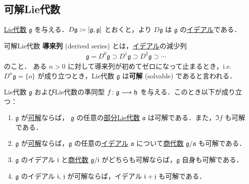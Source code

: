 \documentclass[rep_main]{subfiles}
\begin{document}
\subsection{可解Lie代数}

\hyperref[ax:LieAlg]{Lie代数} $\mathfrak{g}$ を与える．$D \mathfrak{g} \coloneqq \comm{\mathfrak{g}}{\mathfrak{g}}$ とおくと，より $D \mathfrak{g}$ は $\mathfrak{g}$ の\hyperref[def:ideal-LieAlg]{イデアル}である．

\begin{mydef}[label=def:solvable-LieAlg]{可解Lie代数}
    \textbf{導来列} (derived series) とは，\hyperref[def:ideal-LieAlg]{イデアル}の減少列
    \begin{align}
        \mathfrak{g} = D^0 \mathfrak{g} \supset D^1 \mathfrak{g} \supset D^2 \mathfrak{g} \supset \cdots
    \end{align}
    のこと．
    ある $n > 0$ に対して導来列が初めてゼロになって止まるとき，i.e. $D^n \mathfrak{g} = \{o\}$ が成り立つとき，Lie代数 $\mathfrak{g}$ は\textbf{可解} (solvable) であると言われる．
\end{mydef}

\begin{myprop}[label=prop:solvable-basic]{}
    Lie代数 $\mathfrak{g}$ およびLie代数の準同型 $f \colon \mathfrak{g} \longrightarrow \mathfrak{h}$ を与える．このとき以下が成り立つ：
    \begin{enumerate}
        \item $\mathfrak{g}$ が\hyperref[def:solvable-LieAlg]{可解}ならば，
        $\mathfrak{g}$ の任意の\hyperref[def:subLieAlg]{部分Lie代数} $\mathfrak{a}$ は可解である．また，$\Im f$ も可解である．
        \item $\mathfrak{g}$ が\hyperref[def:solvable-LieAlg]{可解}ならば，$\mathfrak{g}$ の任意の\hyperref[def:ideal-LieAlg]{イデアル} $\mathfrak{a}$ について\hyperref[def:quotient-LieAlg]{商代数} $\mathfrak{g} / \mathfrak{a}$ も可解である．
        \item $\mathfrak{g}$ のイデアル $\mathfrak{i}$ と\hyperref[def:quotient-LieAlg]{商代数} $\mathfrak{g}/\mathfrak{i}$ がどちらも可解ならば，$\mathfrak{g}$ 自身も可解である．
        \item $\mathfrak{g}$ のイデアル $\mathfrak{i},\, \mathfrak{j}$ が可解ならば，イデアル $\mathfrak{i} + \mathfrak{j}$ も可解である．
    \end{enumerate}
\end{myprop}
\end{document}
